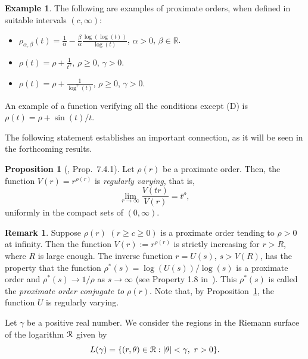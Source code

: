 \documentclass[11pt,a4paper]{article}
\theoremstyle{definition}
\newtheorem{pro}[theo]{Proposition}
\newtheorem{rema}[theo]{Remark}
\newtheorem{exam}[theo]{Example}
\newenvironment{prop}{\smallskip\begin{pro}}{\end{pro}\smallskip}
\def\oo{\infty}
\def\ri{\rightarrow}
\def\a{\alpha}
\def\b{\beta}
\def\ga{\gamma}
\def\ro{\rho}
\def\th{\theta}
\def\R{\mathbb{R}}
\def\Ri{{\cal R}}%
\begin{document}
\begin{exam}\label{exampleOrders}
The following are examples of proximate orders, when defined in suitable intervals $(c,\infty)$:
\begin{itemize}
\item[(i)] $\ro_{\a,\b}(t)=\displaystyle\frac{1}{\a}-\frac{\b}{\a}\frac{\log(\log(t))}{\log(t)}$, $\a>0$, $\b\in\R$.
\item[(ii)] $\rho(t)=\rho+\displaystyle\frac{1}{t^\ga}$, $\ro\ge 0$, $\ga>0$.
\item[(iii)] $\rho(t)=\rho+\displaystyle\frac{1}{\log^\ga(t)}$, $\ro\ge 0$, $\ga>0$.
\end{itemize}
An example of a function verifying all the conditions except (D) is $\ro(t)=\ro+\sin(t)/t$.
\end{exam}

The following statement establishes an important connection, as it will be seen in the forthcoming results.

\begin{prop}[\cite{bingGoldTeug}, Prop.\ 7.4.1]\label{propRegVarOrdAprox}
Let $\ro(r)$ be a proximate order. Then, the function $V(r)=r^{\ro(r)}$ is \textit{regularly varying}, that is,
\begin{equation*}
  \lim_{r \to \infty} \frac{V(tr)}{V(r)}= t^{\ro},
  \end{equation*}
uniformly in the compact sets of $(0,\infty)$.
\end{prop}

\begin{rema}\label{remaInverseRegularlyVarying}
Suppose $\ro(r)$ $(r\geq c\geq0)$ is a proximate order tending to $\ro>0$ at infinity. Then the function $V(r):=r^{\ro(r)}$ is strictly increasing for $r>R$, where $R$ is large enough.
The inverse function $r=U(s)$, $s>V(R)$, has the property that the function $\ro^*(s)=\log( U(s) )/ \log (s)$ is a proximate order
and $\ro^*(s)\ri 1/\ro$ as $s\ri\oo$ (see Property 1.8 in~\cite{Maergoiz}). This $\ro^*(s)$ is called the \textit{proximate order conjugate to $\ro(r)$}. Note that, by Proposition~\ref{propRegVarOrdAprox}, the function $U$ is regularly varying.
\end{rema}


Let $\ga$ be a positive real number. We consider the regions in the Riemann surface of the logarithm $\Ri$ given by
  \begin{equation*}
   L(\ga)=\{ (r,\th) \in \Ri : |\theta|<\ga,\ r>0 \}.
  \end{equation*}
\end{document}
